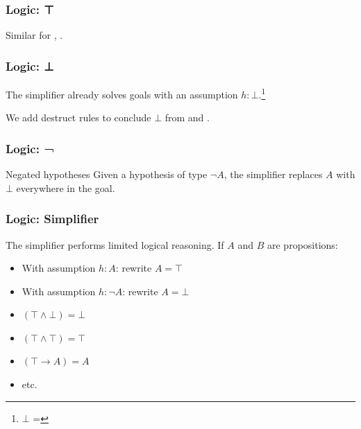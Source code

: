 \documentclass[xetex]{beamer}
\newcommand{\orange}[1]{\textcolor{orange}{#1}}
\newenvironment{rapppic}{\begin{tikzpicture}[outer sep=auto, level distance=2em]}{\end{tikzpicture}}
\newenvironment{rapp}{%
  \begin{tcolorbox}
  \begin{center}
  \begin{rapppic}
}{
  \end{rapppic}
  \end{center}
  \end{tcolorbox}%
}
\begin{document}
\begin{frame}
  \frametitle{Logic: ⊤}


  \pause

  Similar for , .
\end{frame}

\begin{frame}
  \frametitle{Logic: ⊥}

  The simplifier already solves goals with an assumption $h : ⊥$.\footnote{$⊥$ = }

  \pause

  We add destruct rules to conclude $⊥$ from  and .
\end{frame}

\begin{frame}
  \frametitle{Logic: ¬}


  \pause

  \begin{block}{Negated hypotheses}
    Given a hypothesis of type $¬ A$, the simplifier replaces $A$ with $⊥$ everywhere in the goal.
  \end{block}
\end{frame}

\begin{frame}
  \frametitle{Logic: Simplifier}

  The simplifier performs limited logical reasoning.
  If $A$ and $B$ are propositions:

  \pause

  \begin{itemize}[<+->]
    \item With assumption $h : A$: rewrite $A = ⊤$
    \item With assumption $h : ¬ A$: rewrite $A = ⊥$
    \item $(⊤ ∧ ⊥) = ⊥$
    \item $(⊤ ∧ ⊤) = ⊤$
    \item $(⊤ → A) = A$
    \item etc.
  \end{itemize}
\end{frame}
\end{document}
